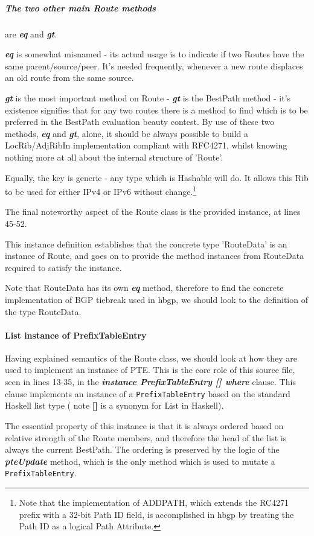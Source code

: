 \subparagraph{The two other main Route methods}
 are \textit{\textbf{eq}} and \textit{\textbf{gt}}.  


\textit{\textbf{eq}} is somewhat misnamed - its actual usage is to indicate if two Routes have the same parent/source/peer.
It's needed frequently, whenever a new route displaces an old route from the same source.

\textit{\textbf{gt}} is the most important method on Route - \textit{\textbf{gt}} is the BestPath method - it's existence signifies that for any two routes there is a method to find which is to be preferred in the BestPath evaluation beauty contest.  By use of these two methods, \textit{\textbf{eq}} and \textit{\textbf{gt}}, alone, it should be always possible to build a LocRib/AdjRibIn implementation compliant with RFC4271, whilst knowing nothing more at all  about the internal structure of 'Route'.

Equally, the key is generic - any type which is Hashable will do.  It allows this Rib to be used for either IPv4 or IPv6 without change.\footnote{Note that the implementation of ADDPATH, which extends the RC4271 prefix with a 32-bit Path ID field, is accomplished in hbgp by treating the Path ID as a logical Path Attribute. }

The final noteworthy aspect of the Route class is the provided instance, at lines 45-52.

This instance definition establishes that the concrete type 'RouteData' is an instance of Route, and goes on to provide the method instances from RouteData required to satisfy the instance.

Note that RouteData has its own \textit{\textbf{eq}} method, therefore to find the concrete implementation of BGP tiebreak used in hbgp, we should look to  the definition of the type RouteData.

\paragraph{List instance of PrefixTableEntry}
Having explained semantics of the Route class, we should look at how they are used to implement an instance of PTE.  This is the core role of this source file, seen in lines 13-35, in the \textit{\textbf{instance PrefixTableEntry [] where}} clause.  This clause implements an instance of a \lstinline|PrefixTableEntry| based on the standard Haskell list type ( note \textbf{[]} is a synonym for List in Haskell).

The essential property of this instance is that it is always ordered based on relative strength of the Route members, and therefore the head of the list is always the current BestPath.  The ordering is preserved by the logic of the  \textit{\textbf{pteUpdate}} method, which is the only method which is used to mutate a \lstinline|PrefixTableEntry|.

